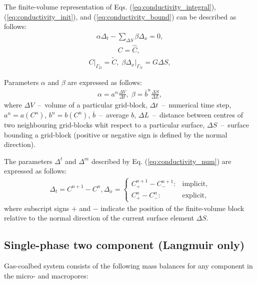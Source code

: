 \documentclass[a4paper,14pt,english]{extreport}
\begin{document}
The finite-volume representation of Eqs. (\ref{eq:conductivity_integral}), (\ref{eq:conductivity_init}), and (\ref{eq:conductivity_bound}) can be described as follows:
    \begin{eqnarray}
        \label{eq:conductivity_num}
        \alpha \Delta_{t} - \sum_{\Delta S} \beta\Delta_{x}= 0,
    \end{eqnarray}
    \begin{eqnarray}
         \label{eq:eq:conductivity_init_num}
        C = \hat{C}, \; 
    \end{eqnarray}
    \begin{eqnarray}
    \label{eq:eq:conductivity_bound_num}
      \label{eq:conductivity_bound_num}
    C \Big|_{\mathit{\Gamma}_D}= \tilde{C}, \; \beta\Delta_x \Big|_{\mathit{\Gamma}_N} = G\Delta S,
    \end{eqnarray}

Parameters $\alpha$ and $\beta$ are expressed as follows:
    \begin{eqnarray}
        \label{eq:alpha_beta}
        \alpha = a^n\frac{\Delta V}{\Delta t}, \;
        \beta= \overline{b}^n\frac{\Delta S}{\Delta L},
    \end{eqnarray}
where $\Delta V$~--~volume of a particular grid-block, $\Delta t$~--~numerical time step, $a^n = a\left(C^n\right)$, $b^n = b\left(C^n\right)$, $\overline{b}$~--~average $b$, $\Delta L$~--~distance between centres of two neighbouring grid-blocks whit respect to a particular surface, $\Delta S$~--~surface bounding a grid-block (positive or negative sign is defined by the normal direction).

The parameters $\Delta^{t}$ and $\Delta^{m}$ described by Eq. (\ref{eq:conductivity_num}) are expressed as follows:
    \begin{eqnarray}
    \label{eq:delta_num}
    \Delta_t = C^{n+1} - C^{n}, \Delta_x = \begin{cases}
    C_{+}^{n+\mathit1} - C_{-}^{n+\mathit1} : &\text{implicit},\\
        C_{+}^{n} - C_{-}^{n} : &\text{explicit},
    \end{cases}
    \end{eqnarray}
where subscript signs $+$ and $-$ indicate the position of the finite-volume block relative to the normal direction of the current surface element $\Delta S$.

 \subsection*{Single-phase two component (Langmuir only)}
Gas-coalbed system consists of the following mass balances for any component in the micro- and macropores:
\end{document}

